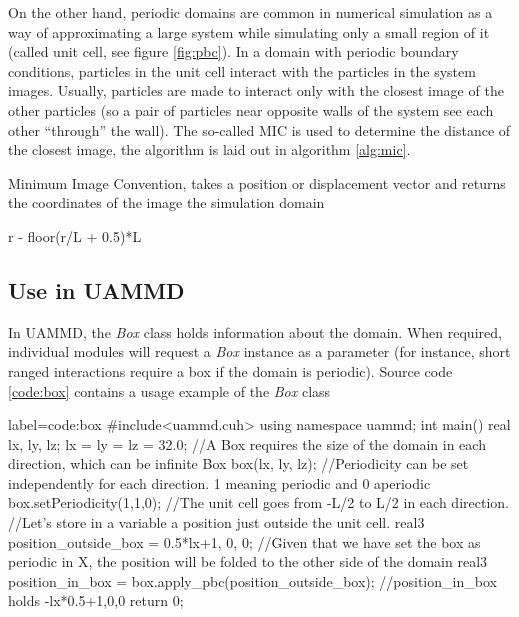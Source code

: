 \documentclass[twoside,openright,titlepage,numbers=noenddot,%
headinclude,footinclude,cleardoublepage=empty,abstract=on,
BCOR=5mm,fontsize=11pt, dvipsnames, paper=b5
]{scrreprt}
\newcommand{\uammd}{\gls{UAMMD}\xspace}
\begin{document}
On the other hand, periodic domains are common in numerical simulation as a way of approximating a large system while simulating only a small region of it (called unit cell, see figure \ref{fig:pbc}). In a domain with periodic boundary conditions, particles in the unit cell interact with the particles in the system images. Usually, particles are made to interact only with the closest image of the other particles (so a pair of particles near opposite walls of the system see each other ``through'' the wall). The so-called \gls{MIC} is used to determine the distance of the closest image, the algorithm is laid out in algorithm \ref{alg:mic}.

\begin{algorithm}
  \caption[ ]{Minimum Image Convention, takes a position or displacement vector and returns the coordinates of the image the simulation domain}
  \label{alg:mic}
  \begin{algorithmic}[1]
    \State \Return r - floor(r/L + 0.5)*L
    \EndFunction
  \end{algorithmic}
\end{algorithm}

\subsection*{Use in UAMMD}
In \uammd, the \emph{Box} class holds information about the domain. When required, individual modules will request a \emph{Box} instance as a parameter (for instance, short ranged interactions require a box if the domain is periodic). Source code \ref{code:box} contains a usage example of the \emph{Box} class
\begin{code2}{label=code:box}
#include<uammd.cuh>
using namespace uammd;
int main(){
  real lx, ly, lz;
  lx = ly = lz = 32.0;
  //A Box requires the size of the domain in each direction, which can be infinite
  Box box({lx, ly, lz});
  //Periodicity can be set independently for each direction. 1 meaning periodic and 0 aperiodic
  box.setPeriodicity(1,1,0);
  //The unit cell goes from -L/2 to L/2 in each direction.
  //Let's store in a variable a position just outside the unit cell.
  real3 position_outside_box = {0.5*lx+1, 0, 0};
  //Given that we have set the box as periodic in X, the position will be folded to the other side of the domain
  real3 position_in_box = box.apply_pbc(position_outside_box);
  //position_in_box holds {-lx*0.5+1,0,0}
  return 0; 
}
\end{code2}
\end{document}
